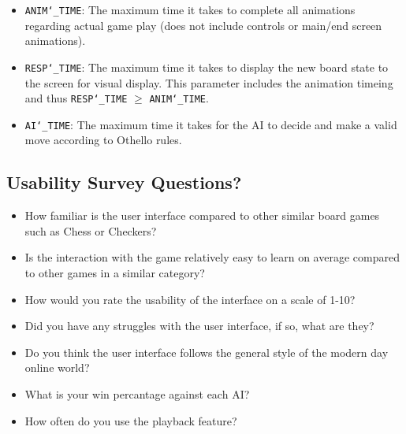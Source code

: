\documentclass[12pt, titlepage]{article}
\begin{document}
\begin{itemize}
	\item \texttt{ANIM\char`_TIME}: The maximum time it takes to complete all animations regarding actual game play (does not include controls or main/end screen animations).
	\item \texttt{RESP\char`_TIME}: The maximum time it takes to display the new board state to the screen for visual display. This parameter includes the animation timeing and thus \texttt{RESP\char`_TIME} $\geq$ \texttt{ANIM\char`_TIME}.
	\item \texttt{AI\char`_TIME}: The maximum time it takes for the AI to decide and make a valid move according to Othello rules.
\end{itemize}

\subsection{Usability Survey Questions?}

\begin{itemize}
	\item How familiar is the user interface compared to other similar board games such as Chess or Checkers?
	\item Is the interaction with the game relatively easy to learn on average compared to other games in a similar category?
	\item How would you rate the usability of the interface on a scale of 1-10?
	\item Did you have any struggles with the user interface, if so, what are they?
	\item Do you think the user interface follows the general style of the modern day online world?
	\color{blue}
	\item What is your win percantage against each AI?
	\item How often do you use the playback feature?
\end{itemize}
\end{document}
